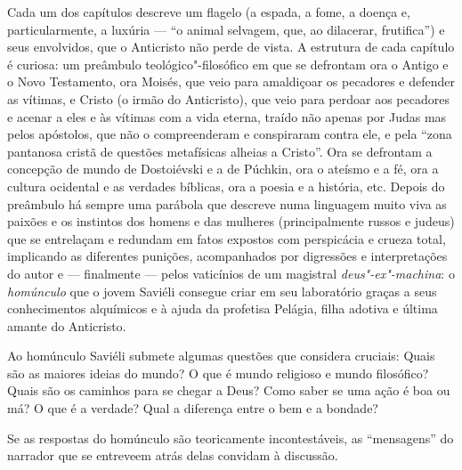 Cada um dos capítulos descreve um flagelo (a espada, a fome, a doença e,
particularmente, a luxúria --- ``o animal selvagem, que, ao dilacerar,
frutifica'') e seus envolvidos, que o Anticristo não perde de vista. A
estrutura de cada capítulo é curiosa: um preâmbulo teológico"-filosófico
em que se defrontam ora o Antigo e o Novo Testamento, ora Moisés, que
veio para amaldiçoar os pecadores e defender as vítimas, e Cristo (o
irmão do Anticristo), que veio para perdoar aos pecadores e acenar a
eles e às vítimas com a vida eterna, traído não apenas por Judas mas
pelos apóstolos, que não o compreenderam e conspiraram contra ele, e pela
``zona pantanosa cristã de questões metafísicas alheias a Cristo''. Ora se
defrontam a concepção de mundo de Dostoiévski e a de Púchkin, ora o ateísmo e a fé, ora a cultura ocidental e as verdades bíblicas, ora a poesia e a
história, etc. Depois do preâmbulo há sempre uma parábola que descreve
numa linguagem muito viva as paixões e os instintos dos homens e das
mulheres (principalmente russos e judeus) que se entrelaçam e redundam
em fatos expostos com perspicácia e crueza total, implicando as
diferentes punições, acompanhados por digressões e interpretações do
autor e --- finalmente --- pelos vaticínios de um magistral \emph{deus"-ex"-machina}:
o \emph{homúnculo} que o jovem Saviéli
consegue criar em seu laboratório graças a seus conhecimentos alquímicos
e à ajuda da profetisa Pelágia, filha adotiva e última amante do
Anticristo.

Ao homúnculo Saviéli submete algumas questões que considera cruciais: Quais são
as maiores ideias do mundo? O que é mundo religioso e mundo filosófico?
Quais são os caminhos para se chegar a Deus? Como saber se uma ação é
boa ou má? O que é a verdade? Qual a diferença entre o bem e a bondade?

Se as respostas do homúnculo são teoricamente incontestáveis, as
``mensagens'' do narrador que se entreveem atrás delas convidam à
discussão.


